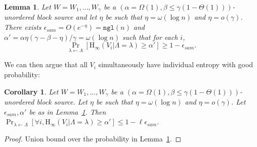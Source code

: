 \documentclass[11pt]{article}
\newcommand{\lemref}[1]{\mbox{Lemma~\ref{#1}}}
\newcommand{\ngl}{\ensuremath{\mathtt{ngl}}\xspace}
\newcommand{\Hoo}{\mathrm{H}_\infty}
\newtheorem{lemma}[theorem]{Lemma}
\newtheorem{corollary}[theorem]{Corollary}
\newcommand{\authnote}[2]{{\textcolor{red}{\textsf{#1 notes: }\textcolor{blue}{ #2}}\marginpar{\textcolor{red}{\textbf{!!!!!}}}}}
\newcommand{\authnote}[2]{}
\newcommand{\bnote}[1]{{\authnote{Ben}{#1}}}
\begin{document}
\begin{lemma}
\label{lem:sampling works}
Let $W = W_1,..., W_\gamma$ be a $(\alpha = \Omega(1), \beta\le \gamma(1- \Theta(1)))$-unordered block source and let $\eta$ be such that $\eta = \omega(\log n)$ and $\eta =  o(\gamma)$.  There exists $\epsilon_{sam} = O(e^{-\eta}) = \ngl(n)$ and $\alpha' = \alpha\eta(\gamma-\beta-\eta)/\gamma = \omega(\log n)$ such that for each $i$,
\[
\Pr_{\lambda\leftarrow \Lambda}[\Hoo(V_i | \Lambda= \lambda) \geq \alpha'] \geq 1- \epsilon_{sam}.
\]
\end{lemma}
%
%

\noindent
We can then argue that all $V_i$ simultaneously have individual entropy with good probability:
\begin{corollary}
\label{cor:samp sec}
Let $W = W_1,..., W_\gamma$ be a $(\alpha = \Omega(1), \beta \leq \gamma(1-\Theta(1)))$-unordered block source.  Let $\eta$ be such that $\eta = \omega(\log n)$ and $\eta =  o(\gamma)$. Let $\epsilon_{sam}, \alpha'$ be as in \lemref{lem:sampling works}.  Then $\Pr_{\lambda\leftarrow \Lambda}[\forall i, \Hoo(V_i | \Lambda = \lambda)  \ge \alpha'] \leq 1-\ell\epsilon_{sam}$.
\end{corollary}
\begin{proof}
Union bound over the probability in \lemref{lem:sampling works}.
\end{proof}
\end{document}
